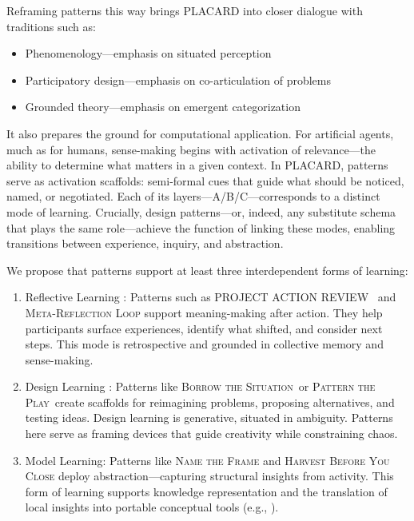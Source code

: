 \documentclass[acmlarge,timestamp]{acmart}
\providecommand{\tightlist}{%
  \setlength{\itemsep}{0pt}\setlength{\parskip}{0pt}}
\begin{document}
Reframing patterns this way brings PLACARD into closer dialogue with
traditions such as:

\begin{itemize}
\tightlist
\item
  Phenomenology—emphasis on situated perception \cite{phenomenology-intro}
\item
  Participatory design—emphasis on co-articulation of problems \cite{participatory-design}
\item
 Grounded theory—emphasis on emergent categorization \cite{glasser}
\end{itemize}

It also prepares the ground for computational application. For
artificial agents, much as for humans, sense-making begins with
activation of relevance---the ability to determine what matters in a
given context. In PLACARD, patterns serve as activation scaffolds:
semi-formal cues that guide what should be noticed, named, or
negotiated.  Each of its layers---A/B/C---corresponds to a distinct
mode of learning.  Crucially, design patterns---or, indeed, any
substitute schema that plays the same role---achieve the function of
linking these modes, enabling transitions between experience, inquiry,
and abstraction.

We propose that patterns support at least three interdependent forms
of learning:

\begin{enumerate}
\tightlist
\item
  Reflective Learning \cite{Boyd1983}: Patterns such as
  PROJECT ACTION REVIEW {~and }{\scshape{Meta-Reflection
      Loop}} support meaning-making after action. They help
  participants surface experiences, identify what shifted, and
  consider next steps. This mode is retrospective and grounded in
  collective memory and sense-making.
\item
 Design Learning \cite{BurdickDesign}: Patterns like {\scshape{Borrow the
     Situation}}~or {\scshape{Pattern the Play}}~create
 scaffolds for reimagining problems, proposing alternatives, and
 testing ideas.  Design learning is generative, situated in
 ambiguity. Patterns here serve as framing devices that guide
 creativity while constraining chaos.
\item Model Learning: Patterns like {\scshape{Name the Frame}} and
  {\scshape{Harvest Before You Close}} deploy abstraction---capturing
  structural insights from activity. This form of learning supports
  knowledge representation and the translation of local insights into
  portable conceptual tools (e.g., \cite{ariyaratne1977a}).
\end{enumerate}
\end{document}
